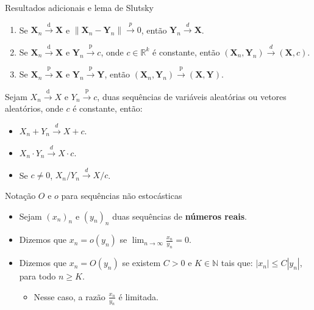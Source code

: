 \documentclass[11pt]{beamer}
\begin{document}
	
	\begin{frame}{Resultados adicionais e lema de Slutsky}
		\begin{lemma}
			\begin{enumerate}
				\item Se $\boldsymbol{X}_n \overset{\text{d}}{\to} \boldsymbol{X}$ e $\lVert \boldsymbol{X}_n - \boldsymbol{Y}_n \rVert\overset{p}{\to}0$, então $\boldsymbol{Y}_n \overset{d}{\to} \boldsymbol{X}$.
				\item Se $\boldsymbol{X}_n \overset{\text{d}}{\to} \boldsymbol{X}$ e $\boldsymbol{Y}_n \overset{\text{p}}{\to} c$, onde $c \in \mathbb{R}^k$ é constante, então $(\boldsymbol{X}_n, \boldsymbol{Y}_n) \overset{d}{\to} (\boldsymbol{X}, c)$.
				
				\item Se $\boldsymbol{X}_n \overset{\text{p}}{\to} \boldsymbol{X}$ e $\boldsymbol{Y}_n \overset{\text{p}}{\to} \boldsymbol{Y}$, então $(\boldsymbol{X}_n, \boldsymbol{Y}_n) \overset{\text{p}}{\to} (\boldsymbol{X}, \boldsymbol{Y}) $.
			\end{enumerate}
		\end{lemma}
		\begin{corollary} Sejam
	${X}_n \overset{\text{d}}{\to} {X}$ e ${Y}_n \overset{\text{p}}{\to} c$, duas sequências de variáveis aleatórias ou vetores aleatórios, onde $c $ é constante, então:
	
	\begin{itemize}
		\item $X_n + Y_n \overset{d}{\to} X + c$.
				\item $X_n \cdot Y_n \overset{d}{\to} X \cdot c$.
				\item Se $c \neq 0$, $X_n/Y_n  \overset{d}{\to} X / c$.
	\end{itemize}
	
		\end{corollary}
	\end{frame}
	
	\begin{frame}{Notação $O$ e $o$ para sequências não estocásticas}
		\begin{itemize}
			\item 	Sejam $(x_n)_n$ e $(y_n)_n$ duas sequências de \textbf{números reais}.
		\item	Dizemos que $x_n = o(y_n)$ se $\lim_{n \to \infty} \frac{x_n}{y_n} = 0$.
		\item 	Dizemos que $x_n = O(y_n)$ se existem $C > 0$ e $K \in \mathbb{N}$ tais que:
		$\left|x_n\right| \leq C | y_n|$, para todo $n \geq K$.
		\begin{itemize}
			\item Nesse caso, a razão $\frac{x_n}{y_n}$ é limitada.
		\end{itemize}
		\end{itemize}

	\end{frame}
	
\end{document}
